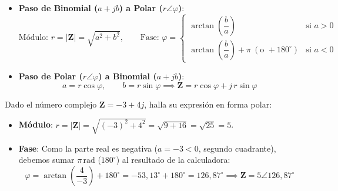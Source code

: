 \begin{ley}
\begin{itemize}
    \item \textbf{Paso de Binomial ($a + jb$) a Polar ($r\angle\varphi$)}:
    \begin{equation}
        \text{Módulo: } r = |\mathbf{Z}| = \sqrt{a^2 + b^2}, \qquad \text{Fase: } \varphi = \begin{cases} \arctan\left(\dfrac{b}{a}\right) & \text{si } a > 0 \\[8pt] \arctan\left(\dfrac{b}{a}\right) + \pi\ (\text{o } +180^\circ) & \text{si } a < 0 \end{cases}
    \end{equation}
    \item \textbf{Paso de Polar ($r\angle\varphi$) a Binomial ($a + jb$)}:
    \begin{equation}
        a = r\cos\varphi, \qquad b = r\sin\varphi \implies \mathbf{Z} = r\cos\varphi + j\,r\sin\varphi
    \end{equation}
\end{itemize}
\end{ley}

\begin{ejemplo}
Dado el número complejo $\mathbf{Z} = -3 + 4j$, halla su expresión en forma polar:
\begin{itemize}
    \item \textbf{Módulo}: $r = |\mathbf{Z}| = \sqrt{(-3)^2 + 4^2} = \sqrt{9 + 16} = \sqrt{25} = 5$.
    \item \textbf{Fase}: Como la parte real es negativa ($a = -3 < 0$, segundo cuadrante), debemos sumar $\pi\,\si{\radian}$ ($180^\circ$) al resultado de la calculadora:
    \begin{equation*}
        \varphi = \arctan\left(\frac{4}{-3}\right) + 180^\circ = -53{,}13^\circ + 180^\circ = 126{,}87^\circ \implies \boxed{\mathbf{Z} = 5\angle 126{,}87^\circ}
    \end{equation*}
\end{itemize}
\end{ejemplo}

